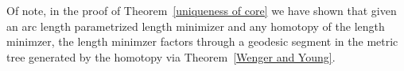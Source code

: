 \documentclass{article}
\newtheorem{corollary}[theorem]{Corollary}
\theoremstyle{definition}
\theoremstyle{remark}
\def\deq{:=}
\DeclareMathOperator{\Ima}{Im}
\newcommand{\core}[1]{{#1}_\infty}
\begin{document}
Of note, in the proof of Theorem~\ref{uniqueness of core} we have shown that given an arc length parametrized length minimizer and any homotopy of the length minimzer, the length minimzer factors through a geodesic segment in the metric tree generated by the homotopy via Theorem~\ref{Wenger and Young}. 








%
%
%
%
%
\end{document}

